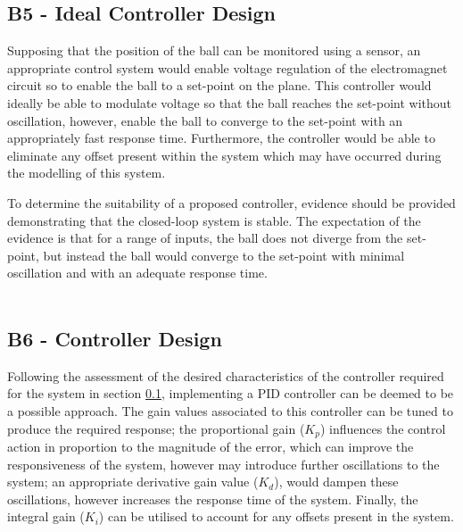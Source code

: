 \documentclass[a4paper,10pt,reqno]{amsart}
\numberwithin{equation}{section}
\begin{document}
\subsection{B5 - Ideal Controller Design}\label{sec:B5}
Supposing that the position of the ball can be monitored using a sensor, an appropriate control system would enable voltage regulation of the electromagnet circuit so to enable the ball to a set-point on the plane. This controller would ideally be able to modulate voltage so that the ball reaches the set-point without oscillation, however, enable the ball to converge to the set-point with an appropriately fast response time. Furthermore, the controller would be able to eliminate any offset present within the system which may have occurred during the modelling of this system. 
\\
\par To determine the suitability of a proposed controller, evidence should be provided demonstrating that the closed-loop system is stable. The expectation of the evidence is that for a range of inputs, the ball does not diverge from the set-point, but instead the ball would converge to the set-point with minimal oscillation and with an adequate response time.\\
\\

\subsection{B6 - Controller Design}
Following the assessment of the desired characteristics of the controller required for the system in section \ref{sec:B5}, implementing a PID controller can be deemed to be a possible approach. The gain values associated to this controller can be tuned to produce the required response; the proportional gain ($K_p$) influences the control action in proportion to the magnitude of the error, which can improve the responsiveness of the system, however may introduce further oscillations to the system; an appropriate derivative gain value ($K_d$), would dampen these oscillations, however increases the response time of the system. Finally, the integral gain ($K_i$) can be utilised to account for any offsets present in the system.
\\
\end{document}
